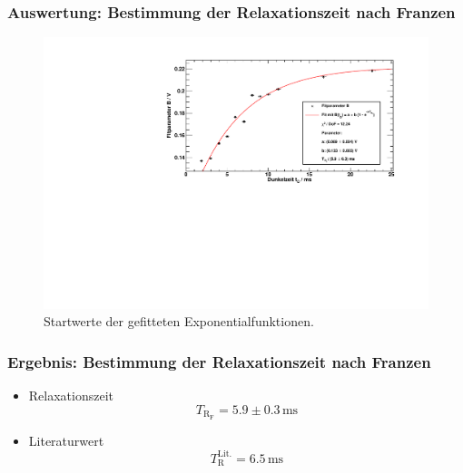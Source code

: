 \begin{frame}
\frametitle{Auswertung: Bestimmung der Relaxationszeit nach Franzen}

\begin{figure}
    \centering
    \includegraphics[width=\textwidth]{../img/BFit.pdf}
    \caption{Startwerte der gefitteten Exponentialfunktionen.}  
\end{figure} 
  
\end{frame}


\begin{frame}
\frametitle{Ergebnis: Bestimmung der Relaxationszeit nach Franzen}
\begin{itemize}
    \item Relaxationszeit
    \begin{equation*}
        T_{\text{R}_\text{F}} = 5.9 \pm 0.3\,\text{ms}
    \end{equation*}
    \item Literaturwert
    \begin{equation*}
        T_{\text{R}}^\text{Lit.} = 6.5\,\text{ms}
    \end{equation*}
\end{itemize}
  
\end{frame}
